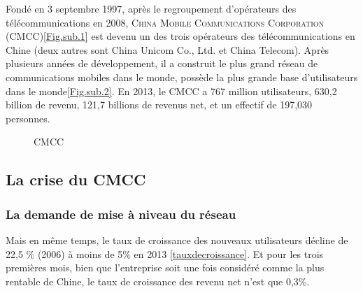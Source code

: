 Fondé en 3 septembre 1997, après le regroupement d'opérateurs des télécommunications en 2008, \textsc{China Mobile Communications Corporation} (\textsf{CMCC})\ref{Fig.sub.1} est devenu un des trois opérateurs des télécommunications en Chine (deux autres sont \textsf{China Unicom Co., Ltd.} et \textsf{China Telecom}). Après plusieurs années de développement, il a construit le plus grand réseau de communications mobiles dans le monde, possède la plus grande base d'utilisateurs dans le monde\ref{Fig.sub.2}. En 2013, le CMCC a 767 million utilisateurs, 630,2 billion \textyen \qquad de revenu, 121,7 billions \textyen de revenus net, et un effectif de 197,030 personnes.
\begin{figure}[H]
	\flushleft
	\hfill
	\hspace{1in}
	\caption{CMCC} 
\end{figure}

\subsection{La crise du CMCC}
\subsubsection{La demande de mise à niveau du réseau}
Mais en même temps, le taux de croissance des nouveaux utilisateurs décline de 22,5 \% (2006) à moins de 5\% en 2013 \ref{tauxdecroissance}. Et pour les trois premières mois, bien que l'entreprise soit une fois considéré comme la plus rentable de Chine, le taux de croissance des revenu net n'est que 0,3\%.

